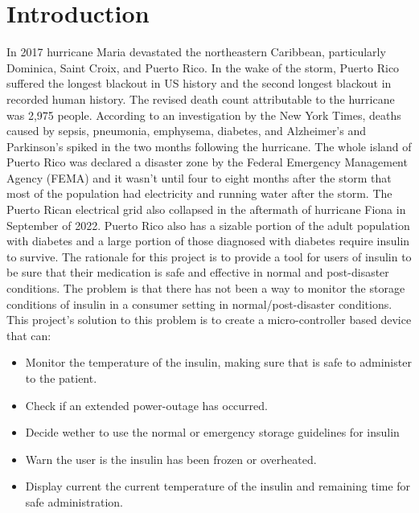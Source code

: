 \section{Introduction}
In 2017 hurricane Maria devastated the northeastern Caribbean, particularly Dominica, Saint Croix, and Puerto Rico. In the wake of the storm, Puerto Rico suffered the longest blackout in US history and the second longest blackout in recorded human history\cite{WorldSecondLargest}. The revised death count attributable to the hurricane was 2,975 people\cite{HurricaneMariaCaused2018}. According to an investigation by the New York Times, deaths caused by  sepsis, pneumonia, emphysema, diabetes, and Alzheimer's and Parkinson's spiked in the two months following the hurricane\cite{roblesOfficialTollPuerto2017}. The whole island of Puerto Rico was declared a disaster zone by the Federal Emergency Management Agency (FEMA) and it wasn't until four to eight months after the storm that most of the population had electricity and running water after the storm. The Puerto Rican electrical grid also collapsed in the aftermath of hurricane Fiona in September of 2022. Puerto Rico also has a sizable portion of the adult population with diabetes and a large portion of those diagnosed with diabetes require insulin to survive\cite{DiabetesPrevalencePopulation}. The rationale for this project is to provide a tool for users of insulin to be sure that their medication is safe and effective in normal and post-disaster conditions. The problem is that there has not been a way to monitor the storage conditions of insulin in a consumer setting in normal/post-disaster conditions. This project's solution to this problem is to create a micro-controller based device that can:
\begin{itemize}
  \item Monitor the temperature of the insulin, making sure that is safe to administer to the patient.
  \item Check if an extended power-outage has occurred.
  \item Decide wether to use the normal or emergency storage guidelines for insulin
  \item Warn the user is the insulin has been frozen or overheated.
  \item Display current the current temperature of the insulin and remaining time for safe administration.
\end{itemize}
